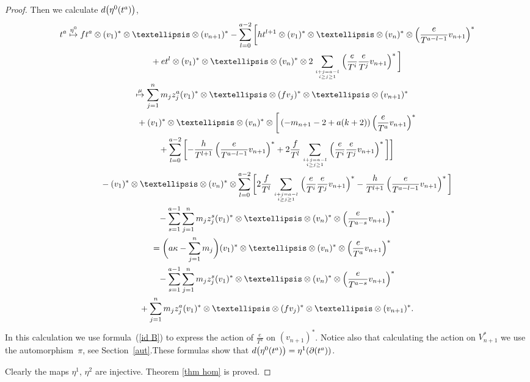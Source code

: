 \documentclass[11pt]{article}
\numberwithin{equation}{section}
\begin{document}
\begin{proof}
Then we calculate ${\rm d}\big(\eta^0(t^a)\big)$,
\begin{gather*}
t^a \overset{\eta^0}\mapsto ft^a\otimes (v_1)^*\otimes\dots\otimes (v_{n+1})^* - \sum_{l=0}^{a-2}\bigg[ht^{l+1}\otimes (v_1)^*\otimes\dots\otimes (v_n)^*\otimes \left(\frac{e}{T^{a-l-1}}v_{n+1}\right)^* \nonumber \\
\hphantom{t^a \overset{\eta^0}\mapsto}{} + et^l\otimes (v_1)^*\otimes\dots\otimes (v_n)^*\otimes 2\sum_{i+j=a-l\atop i\geq j\geq 1} \left(\frac{e}{T^i} \frac{e}{T^j}v_{n+1}\right)^* \bigg]
\nonumber \\
\hphantom{t^a}{}
\overset{\mu} \mapsto 	 \sum_{j=1}^n m_j z_j^a (v_1)^* \otimes \dots \otimes (f v_j)^* \otimes\dots\otimes (v_{n+1})^* \nonumber \\
\hphantom{t^a \overset{\eta^0}\mapsto}{} + (v_1)^* \otimes \dots \otimes (v_n)^* \otimes \bigg[\left(-m_{n+1}-2+a(k+2)\right) \left(\frac{e}{T^a}v_{n+1} \right)^* \nonumber \\
\hphantom{t^a \overset{\eta^0}\mapsto}{}+ \sum_{l=0}^{a-2} \bigg[{-} \frac{h}{T^{l+1}} \left(\frac{e}{T^{a-l-1}} v_{n+1} \right)^* + 2\frac{f}{T^l} \sum_{i+j=a-l\atop i\geq j\geq1} \left(\frac{e}{T^i} \frac{e}{T^j} v_{n+1} \right)^* \bigg] \bigg] \nonumber \\
\hphantom{t^a \overset{\eta^0}\mapsto}{}
-(v_1)^*\otimes\dots\otimes (v_n)^* \otimes \sum_{l=0}^{a-2} \bigg[ 2\frac{f}{T^l} \sum_{i+j=a-l\atop i\geq j\geq1} \left(\frac{e}{T^i} \frac{e}{T^j} v_{n+1} \right)^* - \frac{h}{T^{l+1}} \left(\frac{e}{T^{a-l-1}} v_{n+1} \right)^* \bigg] \nonumber \\
\hphantom{t^a \overset{\eta^0}\mapsto}{} - \sum_{s=1}^{a-1} \sum_{j=1}^n m_j z_j^s (v_1)^* \otimes \dots \otimes (v_n)^* \otimes \left(\frac{e}{T^{a-s}} v_{n+1}\right)^* \nonumber \\
\hphantom{t^a}{} = \bigg(a\kappa - \sum_{j=1}^n m_j\bigg) (v_1)^* \otimes \dots \otimes (v_n)^* \otimes \left(\frac{e}{T^a} v_{n+1}\right)^* \nonumber \\
\hphantom{t^a \overset{\eta^0}\mapsto}{} - \sum_{s=1}^{a-1} \sum_{j=1}^n m_j z_j^s (v_1)^* \otimes \dots \otimes (v_n)^* \otimes \left(\frac{e}{T^{a-s}} v_{n+1}\right)^* \nonumber \\
\hphantom{t^a \overset{\eta^0}\mapsto}{} + \sum_{j=1}^n m_j z_j^a (v_1)^* \otimes \dots \otimes (f v_j)^* \otimes\dots\otimes (v_{n+1})^*. \nonumber
\end{gather*}
In this calculation we use formula~(\ref{id B}) to express the action of $\frac{e}{T^a}$ on $(v_{n+1})^*$. Notice also that calculating the action on $V_{n+1}^*$ we use the automorphism~$\pi$, see Section~\ref{aut}.These formulas show that ${\rm d}\big(\eta^0(t^a)\big) = \eta^1(\partial(t^a))$.

Clearly the maps $\eta^1$, $\eta^2$ are injective. Theorem \ref{thm hom} is proved.
\end{proof}
\end{document}
